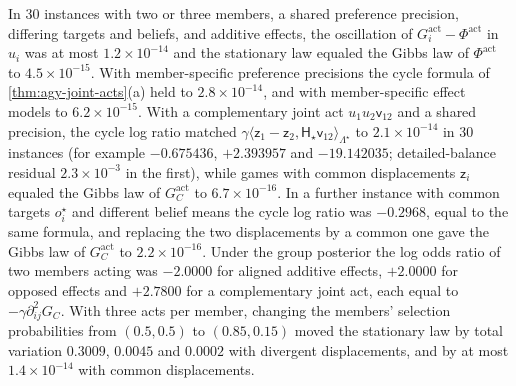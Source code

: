 \begin{numcheck}\label{chk:agy-joint-acts}
In 30 instances with two or three members, a shared preference precision, differing targets and beliefs, and additive effects, the oscillation of $G^{\mathrm{act}}_i-\Phi^{\mathrm{act}}$ in $u_i$ was at most $1.2\times10^{-14}$ and the stationary law equaled the Gibbs law of $\Phi^{\mathrm{act}}$ to $4.5\times10^{-15}$. With member-specific preference precisions the cycle formula of \cref{thm:agy-joint-acts}(a) held to $2.8\times10^{-14}$, and with member-specific effect models to $6.2\times10^{-15}$. With a complementary joint act $u_1u_2\mathsf v_{12}$ and a shared precision, the cycle log ratio matched $\gamma\langle\mathsf z_1-\mathsf z_2,\mathsf H_\star\mathsf v_{12}\rangle_{\Lambda^\star}$ to $2.1\times10^{-14}$ in 30 instances (for example $-0.675436$, $+2.393957$ and $-19.142035$; detailed-balance residual $2.3\times10^{-3}$ in the first), while games with common displacements $\mathsf z_i$ equaled the Gibbs law of $G^{\mathrm{act}}_C$ to $6.7\times10^{-16}$. In a further instance with common targets $o^\star_i$ and different belief means the cycle log ratio was $-0.2968$, equal to the same formula, and replacing the two displacements by a common one gave the Gibbs law of $G^{\mathrm{act}}_C$ to $2.2\times10^{-16}$. Under the group posterior the log odds ratio of two members acting was $-2.0000$ for aligned additive effects, $+2.0000$ for opposed effects and $+2.7800$ for a complementary joint act, each equal to $-\gamma\partial^2_{ij}G_C$. With three acts per member, changing the members' selection probabilities from $(0.5,0.5)$ to $(0.85,0.15)$ moved the stationary law by total variation $0.3009$, $0.0045$ and $0.0002$ with divergent displacements, and by at most $1.4\times10^{-14}$ with common displacements.
\end{numcheck}

